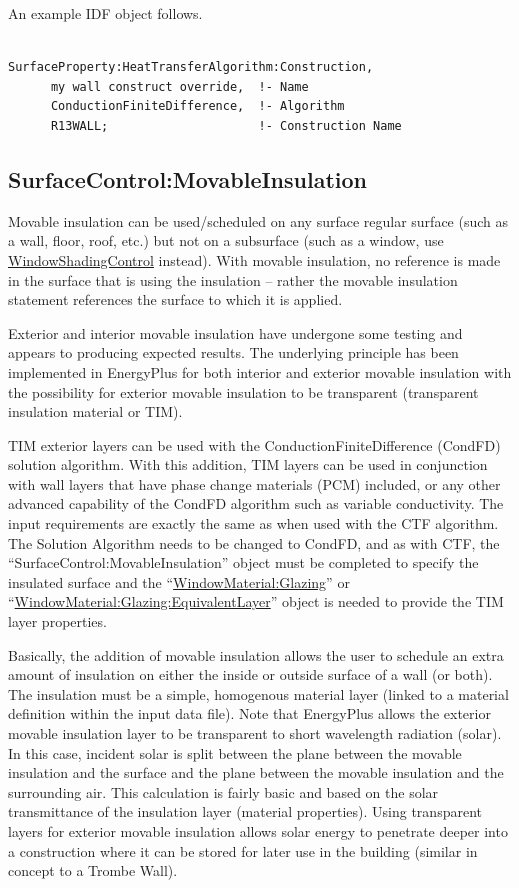 An example IDF object follows.

\begin{lstlisting}

SurfaceProperty:HeatTransferAlgorithm:Construction,
      my wall construct override,  !- Name
      ConductionFiniteDifference,  !- Algorithm
      R13WALL;                     !- Construction Name
\end{lstlisting}

\subsection{SurfaceControl:MovableInsulation}\label{surfacecontrolmovableinsulation}

Movable insulation can be used/scheduled on any surface regular surface (such as a wall, floor, roof, etc.) but not on a subsurface (such as a window, use \hyperref[windowpropertyshadingcontrol]{WindowShadingControl} instead). With movable insulation, no reference is made in the surface that is using the insulation -- rather the movable insulation statement references the surface to which it is applied.

Exterior and interior movable insulation have undergone some testing and appears to producing expected results. The underlying principle has been implemented in EnergyPlus for both interior and exterior movable insulation with the possibility for exterior movable insulation to be transparent (transparent insulation material or TIM).

TIM exterior layers can be used with the ConductionFiniteDifference (CondFD) solution algorithm. With this addition, TIM layers can be used in conjunction with wall layers that have phase change materials (PCM) included, or any other advanced capability of the CondFD algorithm such as variable conductivity. The input requirements are exactly the same as when used with the CTF algorithm. The Solution Algorithm needs to be changed to CondFD, and as with CTF, the ``SurfaceControl:MovableInsulation'' object must be completed to specify the insulated surface and the ``\hyperref[windowmaterialglazing]{WindowMaterial:Glazing}'' or ``\hyperref[windowmaterialglazingequivalentlayer]{WindowMaterial:Glazing:EquivalentLayer}'' object is needed to provide the TIM layer properties.

Basically, the addition of movable insulation allows the user to schedule an extra amount of insulation on either the inside or outside surface of a wall (or both). The insulation must be a simple, homogenous material layer (linked to a material definition within the input data file). Note that EnergyPlus allows the exterior movable insulation layer to be transparent to short wavelength radiation (solar). In this case, incident solar is split between the plane between the movable insulation and the surface and the plane between the movable insulation and the surrounding air. This calculation is fairly basic and based on the solar transmittance of the insulation layer (material properties). Using transparent layers for exterior movable insulation allows solar energy to penetrate deeper into a construction where it can be stored for later use in the building (similar in concept to a Trombe Wall).

